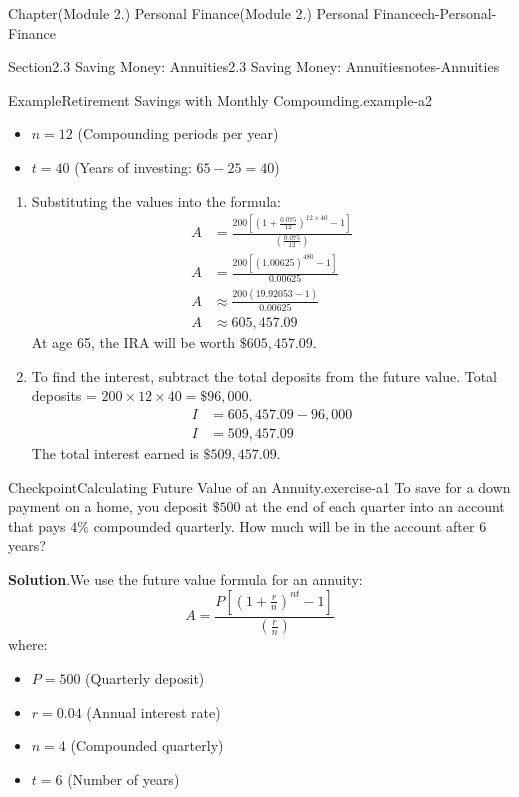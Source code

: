 \documentclass[oneside,10pt,]{book}
\newcommand{\blocktitlefont}{\relax}
\newcommand{\ptxlistdisc}{\raisebox{0.3ex}{\textbullet}}
\newcommand{\amp}{&}
\begin{document}
\begin{chapterptx}{Chapter}{(Module 2.) Personal Finance}{}{(Module 2.) Personal Finance}{}{}{ch-Personal-Finance}
\begin{sectionptx}{Section}{2.3 Saving Money: Annuities}{}{2.3 Saving Money: Annuities}{}{}{notes-Annuities}
\begin{example}{Example}{Retirement Savings with Monthly Compounding.}{example-a2}
\begin{itemize}[label=\ptxlistdisc]
\item{}\(n = 12\) (Compounding periods per year)%
\item{}\(t = 40\) (Years of investing: \(65 - 25 = 40\))%
\end{itemize}
%
\par
%
\begin{enumerate}[label={\arabic*}]
\item{}Substituting the values into the formula:%
\begin{align*}
A \amp = \frac{200\left[\left(1 + \frac{0.075}{12}\right)^{12 \times 40} - 1\right]}{\left(\frac{0.075}{12}\right)}\\
A \amp = \frac{200\left[(1.00625)^{480} - 1\right]}{0.00625}\\
A \amp \approx \frac{200(19.92053 - 1)}{0.00625}\\
A \amp \approx 605,457.09
\end{align*}
At age 65, the IRA will be worth \(\$605,457.09\).%
\item{}To find the interest, subtract the total deposits from the future value. Total deposits = \(200 \times 12 \times 40 = \$96,000\).%
\begin{align*}
I \amp = 605,457.09 - 96,000\\
I \amp = 509,457.09
\end{align*}
The total interest earned is \(\$509,457.09\).%
\end{enumerate}
%
\end{example}
\begin{inlineexercise}{Checkpoint}{Calculating Future Value of an Annuity.}{exercise-a1}%
To save for a down payment on a home, you deposit \(\$500\) at the end of each quarter into an account that pays \(4\%\) compounded quarterly. How much will be in the account after \(6\) years?%
\par\smallskip%
\noindent\textbf{\blocktitlefont Solution}.\hypertarget{exercise-a1-3}{}\quad{}We use the future value formula for an annuity:%
\begin{equation*}
A = \frac{P\left[\left(1+\frac{r}{n}\right)^{nt}-1\right]}{\left(\frac{r}{n}\right)}
\end{equation*}
where:%
\begin{itemize}[label=\ptxlistdisc]
\item{}\(P = 500\) (Quarterly deposit)%
\item{}\(r = 0.04\) (Annual interest rate)%
\item{}\(n = 4\) (Compounded quarterly)%
\item{}\(t = 6\) (Number of years)%

\end{itemize}
\end{inlineexercise}
\end{sectionptx}
\end{chapterptx}
\end{document}
